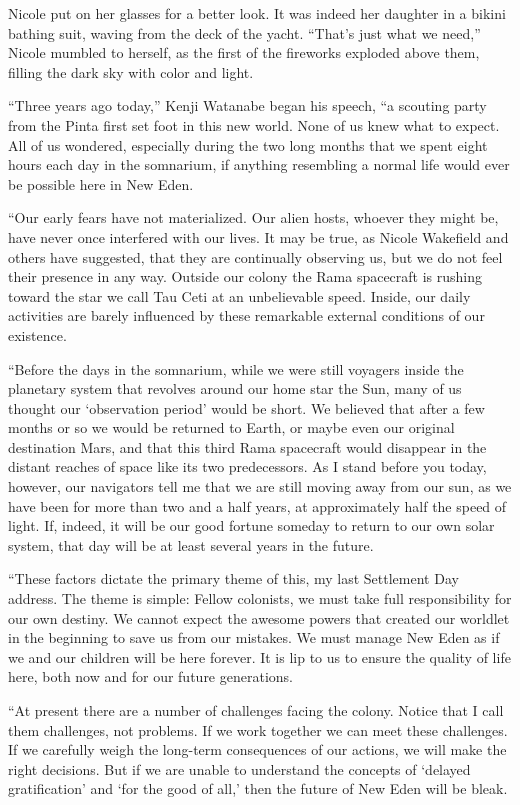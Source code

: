 \documentclass[]{article}
\begin{document}
{Nicole put on her glasses for a better look. It was indeed her daughter in a bikini bathing suit, waving from the deck of the yacht. “That’s just what we need,” Nicole mumbled to herself, as the first of the fireworks exploded above them, filling the dark sky with color and light.

“Three years ago today,” Kenji Watanabe began his speech, “a scouting party from the Pinta first set foot in this new world. None of us knew what to expect. All of us wondered, especially during the two long months that we spent eight hours each day in the somnarium, if anything resembling a normal life would ever be possible here in New Eden.

“Our early fears have not materialized. Our alien hosts, whoever they might be, have never once interfered with our lives. It may be true, as Nicole Wakefield and others have suggested, that they are continually observing us, but we do not feel their presence in any way. Outside our colony the Rama spacecraft is rushing toward the star we call Tau Ceti at an unbelievable speed. Inside, our daily activities are barely influenced by these remarkable external conditions of our existence.

“Before the days in the somnarium, while we were still voyagers inside the planetary system that revolves around our home star the Sun, many of us thought our ‘observation period’ would be short. We believed that after a few months or so we would be returned to Earth, or maybe even our original destination Mars, and that this third Rama spacecraft would disappear in the distant reaches of space like its two predecessors. As I stand before you today, however, our navigators tell me that we are still moving away from our sun, as we have been for more than two and a half years, at approximately half the speed of light. If, indeed, it will be our good fortune someday to return to our own solar system, that day will be at least several years in the future.

“These factors dictate the primary theme of this, my last Settlement Day address. The theme is simple: Fellow colonists, we must take full responsibility for our own destiny. We cannot expect the awesome powers that created our worldlet in the beginning to save us from our mistakes. We must manage New Eden as if we and our children will be here forever. It is lip to us to ensure the quality of life here, both now and for our future generations.

“At present there are a number of challenges facing the colony. Notice that I call them challenges, not problems. If we work together we can meet these challenges. If we carefully weigh the long-term consequences of our actions, we will make the right decisions. But if we are unable to understand the concepts of ‘delayed gratification’ and ‘for the good of all,’ then the future of New Eden will be bleak.

}
\end{document}
